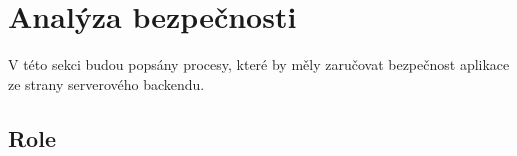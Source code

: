             

\section{Analýza bezpečnosti}
    V této sekci budou popsány procesy, které by měly zaručovat bezpečnost aplikace ze strany serverového backendu.
    
    \subsection{Role}\label{analyza:bezpecnost:role}
    
